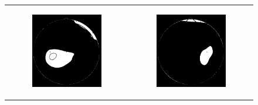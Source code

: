 \begin{figure}[!ht]
    \centering
    \begin{tabular}{cc}
        \begin{subfigure}[c]{0.3\textwidth}
            \centering
            \includegraphics{images/topomap_delta_binary.png}
            \caption{}
        \end{subfigure}
        &
        \begin{subfigure}[c]{0.3\textwidth}
            \centering
            \includegraphics{images/topomap_theta_binary.png}
            \caption{}
        \end{subfigure}
    \end{tabular}
    \vspace{\abovecaptionskip}

\end{figure}
